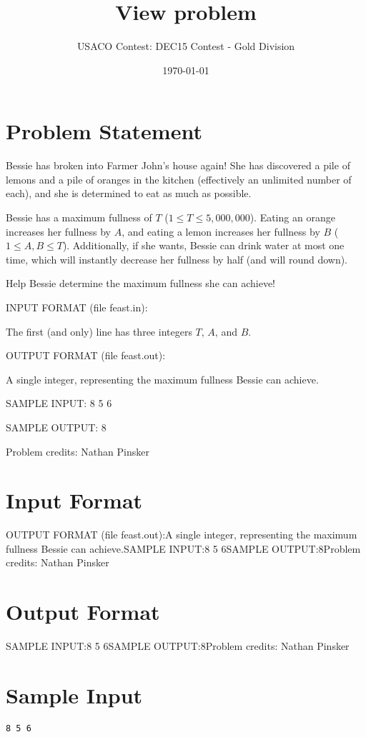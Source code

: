 \documentclass[12pt]{article}
\title{View problem}
\author{USACO Contest: DEC15 Contest - Gold Division}
\date{\today}
\begin{document}
\maketitle

\section*{Problem Statement}

Bessie has broken into Farmer John's house again!  She has discovered a pile of
lemons and a pile of oranges in the kitchen (effectively an unlimited number of
each), and she is determined to eat as much as possible.

Bessie has a maximum fullness of $T$ ($1 \le T \le 5,000,000$). Eating an orange
increases her fullness by $A$, and eating a lemon increases her fullness by $B$
($1 \le A, B \le T$). Additionally, if she wants, Bessie can drink water at most
one time, which will instantly decrease her fullness by half (and will round
down).

Help Bessie determine the maximum fullness she can achieve!

INPUT FORMAT (file feast.in):

The first (and only) line has three integers $T$, $A$, and $B$.


OUTPUT FORMAT (file feast.out):

A single integer, representing the maximum fullness Bessie can achieve.


SAMPLE INPUT:
8 5 6

SAMPLE OUTPUT: 
8

Problem credits: Nathan Pinsker



\section*{Input Format}
OUTPUT FORMAT (file feast.out):A single integer, representing the maximum fullness Bessie can achieve.SAMPLE INPUT:8 5 6SAMPLE OUTPUT:8Problem credits: Nathan Pinsker

\section*{Output Format}
SAMPLE INPUT:8 5 6SAMPLE OUTPUT:8Problem credits: Nathan Pinsker

\section*{Sample Input}
\begin{verbatim}
8 5 6
\end{verbatim}
\end{document}
